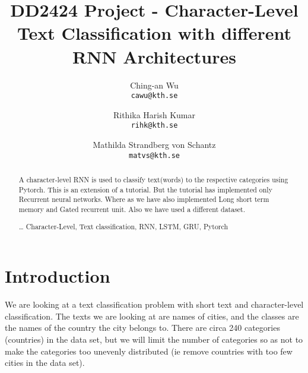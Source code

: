 \documentclass[runningheads]{llncs}
\begin{document}
\pagestyle{headings}
\mainmatter
\def\ECCV16SubNumber{***}
\title{DD2424 Project - Character-Level Text Classification with different RNN Architectures}
\author{
	Ching-an Wu\\
    {\tt cawu@kth.se}
    \and
    Rithika Harish Kumar\\
    {\tt rihk@kth.se}
    \and
	Mathilda Strandberg von Schantz\\
    {\tt matvs@kth.se}
}

\maketitle


\begin{abstract}

A character-level RNN is used to classify text(words) to the respective categories using Pytorch. This is an extension of a tutorial\cite{maintutorial}. But the tutorial has implemented only Recurrent neural networks. Where as we have also implemented Long short term memory and Gated recurrent unit. Also we have used a different dataset.   

\dots
{}
Character-Level, Text classification, RNN, LSTM, GRU, Pytorch 
\end{abstract}


\section{Introduction}


We are looking at a text classification problem with short text and character-level classification. The texts we are looking at are names of cities, and the classes are the names of the country the city belongs to. There are circa 240 categories (countries) in the data set, but we will limit the number of categories so as not to make the categories too unevenly distributed (ie remove countries with too few cities in the data set).
\end{document}

